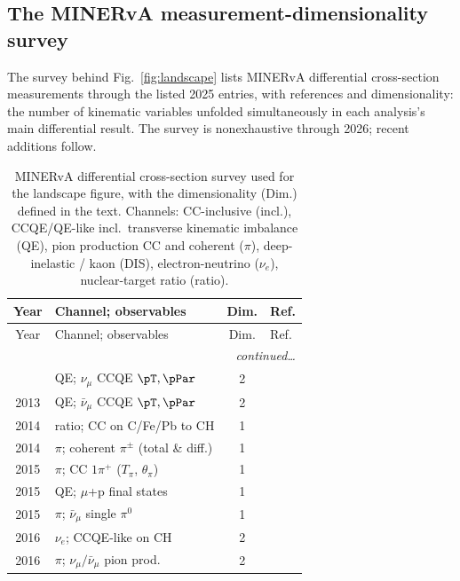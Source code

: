 \subsection{The MINERvA measurement-dimensionality survey}
\label{app:landscape}

The survey behind Fig.~\ref{fig:landscape} lists MINERvA differential cross-section measurements through the listed 2025 entries, with references and dimensionality: the number of kinematic variables unfolded simultaneously in each analysis's main differential result. The survey is nonexhaustive through 2026; recent additions follow.

{\small
\begin{longtable}{@{}clcl@{}}
  \caption{MINERvA differential cross-section survey used for the landscape figure, with the dimensionality
  (Dim.) defined in the text. Channels: CC-inclusive (incl.),
  CCQE/QE-like incl.\ transverse kinematic imbalance (QE), pion production CC
  and coherent ($\pi$), deep-inelastic / kaon (DIS), electron-neutrino
  ($\nu_e$), nuclear-target ratio (ratio).}
  \label{tab:landscape}\\
  \toprule
  Year & Channel; observables & Dim. & Ref. \\
  \midrule
  \endfirsthead
  \toprule
  Year & Channel; observables & Dim. & Ref. \\
  \midrule
  \endhead
  \midrule \multicolumn{4}{r}{\emph{continued\ldots}}\\ \endfoot
  \bottomrule
  \endlastfoot
  2013 & QE; $\nu_\mu$ CCQE $\pT,\pPar$            & 2 & \cite{MINERvA:2013qe} \\
  2013 & QE; $\bar\nu_\mu$ CCQE $\pT,\pPar$        & 2 & \cite{MINERvA:2013qebar} \\
  2014 & ratio; CC on C/Fe/Pb to CH               & 1 & \cite{MINERvA:2014ratio} \\
  2014 & $\pi$; coherent $\pi^\pm$ (total \& diff.) & 1 & \cite{MINERvA:2014coh} \\
  2015 & $\pi$; CC $1\pi^+$ ($T_\pi$, $\theta_\pi$) & 1 & \cite{MINERvA:2015ydy} \\
  2015 & QE; $\mu$+p final states                 & 1 & \cite{MINERvA:2015mup} \\
  2015 & $\pi$; $\bar\nu_\mu$ single $\pi^0$       & 1 & \cite{MINERvA:2015pi0} \\
  2016 & $\nu_e$; CCQE-like on CH                  & 2 & \cite{MINERvA:2016nueqe} \\
  2016 & $\pi$; $\nu_\mu/\bar\nu_\mu$ pion prod.   & 2 & \cite{MINERvA:2016pion} \\

\end{longtable}}
